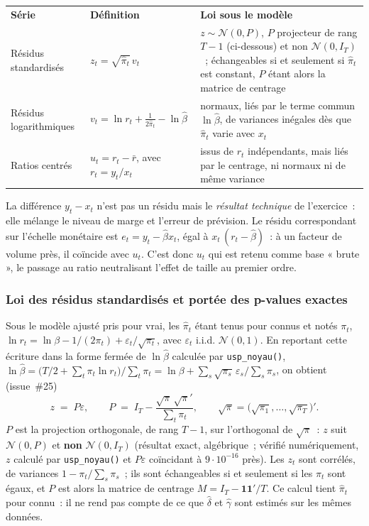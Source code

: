 \documentclass[a4paper,11pt]{article}
\newcommand{\code}[1]{\texttt{\small #1}}
\begin{document}
\begin{center}
\small
{}
\begin{tabular}{@{}p{2.6cm}p{4.6cm}p{7.6cm}@{}}
\rowcolor{tableheader}
\textcolor{financeblue}{\textbf{Série}} &
\textcolor{financeblue}{\textbf{Définition}} &
\textcolor{financeblue}{\textbf{Loi sous le modèle}} \\
Résidus standardisés & $z_t = \sqrt{\hat\pi_t}\,v_t$ &
$z \sim \mathcal{N}(0, P)$, $P$ projecteur de rang $T-1$ (ci-dessous) et non
$\mathcal{N}(0, I_T)$~; échangeables si et seulement si $\hat\pi_t$ est constant,
$P$ étant alors la matrice de centrage \\
Résidus logarithmiques & $v_t = \ln r_t + \tfrac{1}{2\hat\pi_t} - \ln\hat\beta$ &
normaux, liés par le terme commun $\ln\hat\beta$, de variances inégales dès que
$\hat\pi_t$ varie avec $x_t$ \\
Ratios centrés & $u_t = r_t - \bar r$, avec $r_t = y_t/x_t$ &
issus de $r_t$ indépendants, mais liés par le centrage, ni normaux ni de même
variance \\
\end{tabular}
\end{center}

\noindent
La différence $y_t - x_t$ n'est pas un résidu mais le \emph{résultat technique}
de l'exercice~: elle mélange le niveau de marge et l'erreur de prévision. Le
résidu correspondant sur l'échelle monétaire est $e_t = y_t - \hat\beta x_t$,
égal à $x_t\,(r_t - \hat\beta)$~: à un facteur de volume près, il coïncide avec
$u_t$. C'est donc $u_t$ qui est retenu comme base « brute », le passage au ratio
neutralisant l'effet de taille au premier ordre.

\subsubsection*{Loi des résidus standardisés et portée des p-values exactes}

Sous le modèle ajusté pris pour vrai, les $\hat\pi_t$ étant tenus pour connus et notés $\pi_t$,
$\ln r_t = \ln\beta - 1/(2\pi_t) + \varepsilon_t/\sqrt{\pi_t}$, avec $\varepsilon_t$ i.i.d.
$\mathcal{N}(0,1)$. En reportant cette écriture dans la forme fermée de $\ln\hat\beta$ calculée par
\code{usp\_noyau()}, $\ln\hat\beta = \big(T/2 + \sum_t \pi_t \ln r_t\big)\big/\sum_t \pi_t =
\ln\beta + \sum_s \sqrt{\pi_s}\,\varepsilon_s \big/ \sum_s \pi_s$, on obtient (issue~\#25)
\[
  z \;=\; P\varepsilon,
  \qquad
  P \;=\; I_T - \frac{\sqrt{\pi}\,\sqrt{\pi}'}{\sum_t \pi_t},
  \qquad
  \sqrt{\pi} = \big(\sqrt{\pi_1}, \dots, \sqrt{\pi_T}\big)'.
\]
$P$ est la projection orthogonale, de rang $T-1$, sur l'orthogonal de $\sqrt{\pi}$~: $z$ suit
$\mathcal{N}(0, P)$ et \textbf{non} $\mathcal{N}(0, I_T)$ (résultat exact, algébrique~; vérifié
numériquement, $z$ calculé par \code{usp\_noyau()} et $P\varepsilon$ coïncidant à
$9\cdot 10^{-16}$ près). Les $z_t$ sont corrélés, de variances $1 - \pi_t/\sum_s \pi_s$~; ils
sont échangeables si et seulement si les $\pi_t$ sont égaux, et $P$ est alors la matrice de
centrage $M = I_T - \mathbf{1}\mathbf{1}'/T$. Ce calcul tient $\hat\pi_t$ pour connu~: il ne
rend pas compte de ce que $\hat\delta$ et $\hat\gamma$ sont estimés sur les mêmes données.
\end{document}
